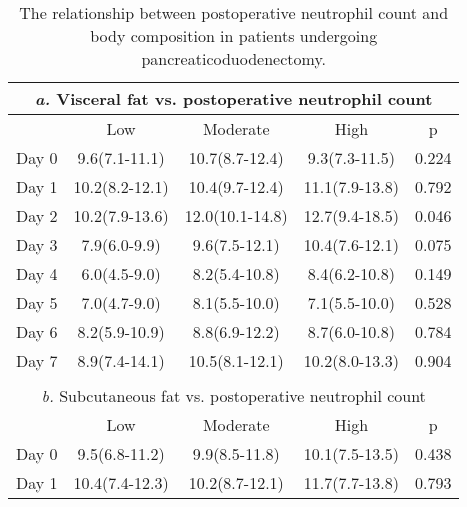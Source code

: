 \begin{table}[p]
	\caption{The relationship  between postoperative neutrophil count and body composition in patients undergoing pancreaticoduodenectomy. }
	\label{table:sirs_bodycomp_neut}
	\centering
	\renewcommand{\arraystretch}{1.2} %
	\setlength{\tabcolsep}{9pt} %
	
	\begin{tabular}{|l c c c c |}
		        \multicolumn{5}{c}{\textit{a.} Visceral fat vs. postoperative neutrophil count}         \\ \hline
		      & Low            & Moderate        & High            & p                                  \\
		Day 0 & 9.6(7.1-11.1)  & 10.7(8.7-12.4)  & 9.3(7.3-11.5)   & 0.224                              \\
		Day 1 & 10.2(8.2-12.1) & 10.4(9.7-12.4)  & 11.1(7.9-13.8)  & 0.792                              \\
		Day 2 & 10.2(7.9-13.6) & 12.0(10.1-14.8) & 12.7(9.4-18.5)  & 0.046                              \\
		Day 3 & 7.9(6.0-9.9)   & 9.6(7.5-12.1)   & 10.4(7.6-12.1)  & 0.075                              \\
		Day 4 & 6.0(4.5-9.0)   & 8.2(5.4-10.8)   & 8.4(6.2-10.8)   & 0.149                              \\
		Day 5 & 7.0(4.7-9.0)   & 8.1(5.5-10.0)   & 7.1(5.5-10.0)     & 0.528                              \\
		Day 6 & 8.2(5.9-10.9)  & 8.8(6.9-12.2)   & 8.7(6.0-10.8)   & 0.784                              \\
		Day 7 & 8.9(7.4-14.1)  & 10.5(8.1-12.1)  & 10.2(8.0-13.3)  & 0.904                              \\ \hline
		                                     \multicolumn{5}{c}{}                                       \\
		      \multicolumn{5}{c}{\textit{b.} Subcutaneous fat vs. postoperative neutrophil count}       \\ \hline
		      & Low            & Moderate        & High            & p                                  \\
		Day 0 & 9.5(6.8-11.2)  & 9.9(8.5-11.8)   & 10.1(7.5-13.5)  & 0.438                              \\
		Day 1 & 10.4(7.4-12.3) & 10.2(8.7-12.1)  & 11.7(7.7-13.8)  & 0.793                              \\

\end{tabular}
\end{table}
